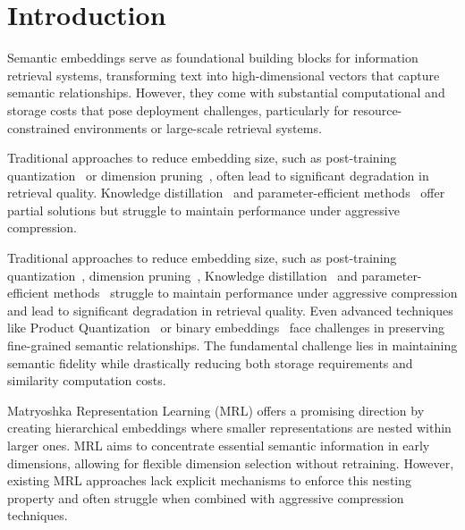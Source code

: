 \section{Introduction}
Semantic embeddings serve as foundational building blocks for information retrieval systems, transforming text into high-dimensional vectors that capture semantic relationships. 
However, they come with substantial computational and storage costs that pose deployment challenges, particularly for resource-constrained environments or large-scale retrieval systems.

Traditional approaches to reduce embedding size, such as post-training quantization~\cite{jacob2018quantization} or dimension pruning~\cite{li2016pruning}, often lead to significant degradation in retrieval quality. 
Knowledge distillation~\cite{hinton2015distilling} and parameter-efficient methods~\cite{houlsby2019parameter} offer partial solutions but struggle to maintain performance under aggressive compression. 


Traditional approaches to reduce embedding size, such as post-training quantization~\cite{jacob2018quantization}, dimension pruning~\cite{li2016pruning}, Knowledge distillation~\cite{hinton2015distilling} and parameter-efficient methods~\cite{houlsby2019parameter} struggle to maintain performance under aggressive compression and lead to significant degradation in retrieval quality. 
Even advanced techniques like Product Quantization~\cite{jegou2010product} or binary embeddings~\cite{shen2018nash, tissier2019binarization, shu2018compressing} face challenges in preserving fine-grained semantic relationships. 
The fundamental challenge lies in maintaining semantic fidelity while drastically reducing both storage requirements and similarity computation costs.

Matryoshka Representation Learning (MRL) \cite{kusupati2021matryoshka} offers a promising direction by creating hierarchical embeddings where smaller representations are nested within larger ones. 
MRL aims to concentrate essential semantic information in early dimensions, allowing for flexible dimension selection without retraining. 
However, existing MRL approaches lack explicit mechanisms to enforce this nesting property and often struggle when combined with aggressive compression techniques.

